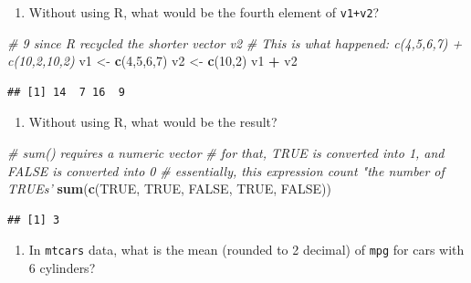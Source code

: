\documentclass[]{book}
\newenvironment{Shaded}{\begin{snugshade}}{\end{snugshade}}
\newcommand{\CommentTok}[1]{\textcolor[rgb]{0.56,0.35,0.01}{\textit{#1}}}
\newcommand{\DecValTok}[1]{\textcolor[rgb]{0.00,0.00,0.81}{#1}}
\newcommand{\KeywordTok}[1]{\textcolor[rgb]{0.13,0.29,0.53}{\textbf{#1}}}
\newcommand{\NormalTok}[1]{#1}
\newcommand{\OperatorTok}[1]{\textcolor[rgb]{0.81,0.36,0.00}{\textbf{#1}}}
\newcommand{\OtherTok}[1]{\textcolor[rgb]{0.56,0.35,0.01}{#1}}
\newcommand{\StringTok}[1]{\textcolor[rgb]{0.31,0.60,0.02}{#1}}
\providecommand{\tightlist}{%
  \setlength{\itemsep}{0pt}\setlength{\parskip}{0pt}}
\begin{document}
\begin{enumerate}
\def\labelenumi{\arabic{enumi}.}
\setcounter{enumi}{2}
\tightlist
\item
  Without using R, what would be the fourth element of \texttt{v1+v2}?
\end{enumerate}

\begin{Shaded}
\begin{Highlighting}[]
\CommentTok{# 9 since R recycled the shorter vector v2 }
\CommentTok{# This is what happened: c(4,5,6,7) + c(10,2,10,2)}
\NormalTok{v1 <-}\StringTok{ }\KeywordTok{c}\NormalTok{(}\DecValTok{4}\NormalTok{,}\DecValTok{5}\NormalTok{,}\DecValTok{6}\NormalTok{,}\DecValTok{7}\NormalTok{)}
\NormalTok{v2 <-}\StringTok{ }\KeywordTok{c}\NormalTok{(}\DecValTok{10}\NormalTok{,}\DecValTok{2}\NormalTok{)}
\NormalTok{v1 }\OperatorTok{+}\StringTok{ }\NormalTok{v2}
\end{Highlighting}
\end{Shaded}

\begin{verbatim}
## [1] 14  7 16  9
\end{verbatim}

\begin{enumerate}
\def\labelenumi{\arabic{enumi}.}
\setcounter{enumi}{3}
\tightlist
\item
  Without using R, what would be the result?
\end{enumerate}

\begin{Shaded}
\begin{Highlighting}[]
\CommentTok{# sum() requires a numeric vector}
\CommentTok{# for that, TRUE is converted into 1, and FALSE is converted into 0}
\CommentTok{# essentially, this expression count "the number of TRUEs'}
\KeywordTok{sum}\NormalTok{(}\KeywordTok{c}\NormalTok{(}\OtherTok{TRUE}\NormalTok{, }\OtherTok{TRUE}\NormalTok{, }\OtherTok{FALSE}\NormalTok{, }\OtherTok{TRUE}\NormalTok{, }\OtherTok{FALSE}\NormalTok{))}
\end{Highlighting}
\end{Shaded}

\begin{verbatim}
## [1] 3
\end{verbatim}

\begin{enumerate}
\def\labelenumi{\arabic{enumi}.}
\setcounter{enumi}{4}
\tightlist
\item
  In \texttt{mtcars} data, what is the mean (rounded to 2 decimal) of \texttt{mpg} for cars with 6 cylinders?
\end{enumerate}
\end{document}
